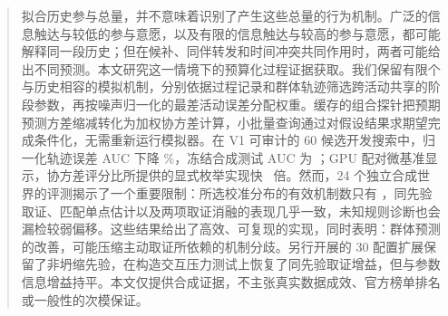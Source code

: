 \begin{abstract}
拟合历史参与总量，并不意味着识别了产生这些总量的行为机制。广泛的信息触达与较低的参与意愿，以及有限的信息触达与较高的参与意愿，都可能解释同一段历史；但在候补、同伴转发和时间冲突共同作用时，两者可能给出不同预测。本文研究这一情境下的预算化过程证据获取。我们保留有限个与历史相容的模拟机制，分别依据过程记录和群体轨迹筛选跨活动共享的阶段参数，再按噪声归一化的最差活动误差分配权重。缓存的组合探针把预期预测方差缩减转化为加权协方差计算，小批量查询通过对假设结果求期望完成条件化，无需重新运行模拟器。在 V1 可审计的 60 候选开发搜索中，归一化轨迹误差 AUC 下降 \DevReduction\%，冻结合成测试 AUC 为 \TestAUC；GPU 配对微基准显示，协方差评分比所提供的显式枚举实现快 \FrozenSpeed\ 倍。然而，24 个独立合成世界的评测揭示了一个重要限制：所选校准分布的有效机制数只有 \ESS，同先验取证、匹配单点估计以及两项取证消融的表现几乎一致，未知规则诊断也会漏检较弱偏移。这些结果给出了高效、可复现的实现，同时表明：群体预测的改善，可能压缩主动取证所依赖的机制分歧。另行开展的 30 配置扩展保留了非坍缩先验，在构造交互压力测试上恢复了同先验取证增益，但与参数信息增益持平。本文仅提供合成证据，不主张真实数据成效、官方榜单排名或一般性的次模保证。
\end{abstract}
